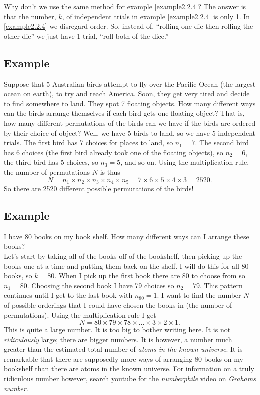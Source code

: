 \noindent Why don't we use the same method for example \ref{example2.2.4}? The answer is that the number, $k$, of independent trials in example \ref{example2.2.4} is only 1. In \ref{example2.2.4} we disregard order. So, instead of, ``rolling one die then rolling the other die'' we just have 1 trial, ``roll both of the dice.''

\subsection{Example} \label{example1}
Suppose that 5 Australian birds attempt to fly over the Pacific Ocean (the largest ocean on earth), to try and reach America. Soon, they get very tired and decide to find somewhere to land. They spot 7 floating objects. How many different ways can the birds arrange themselves if each bird gets one floating object? That is, how many different permutations of the birds can we have if the birds are ordered by their choice of object? Well, we have 5 birds to land, so we have 5 independent trials. The first bird has 7 choices for places to land, so $n_1 = 7$. The second bird has 6 choices (the first bird already took one of the floating objects), so $n_2 = 6$, the third bird has 5 choices, so $n_3 = 5$, and so on. Using the multiplication rule, the number of permutations $N$ is thus
\[
N = n_1\times n_2 \times n_3 \times n_4 \times n_5 = 7\times 6 \times 5 \times 4 \times 3 = 2520.
\]
So there are 2520 different possible permutations of the birds!

\subsection{Example} \label{example2} \label{80books}
I have 80 books on my book shelf. How many different ways can I arrange these books? \\

\noindent Let's start by taking all of the books off of the bookshelf, then picking up the books one at a time and putting them back on the shelf. I will do this for all 80 books, so $k = 80$. When I pick up the first book there are 80 to choose from so $n_1 = 80$. Choosing the second book I have 79 choices so $n_2 = 79$. This pattern continues until I get to the last book with $n_{80} = 1$. I want to find the number $N$ of possible orderings that I could have chosen the books in (the number of permutations). Using the multiplication rule I get
\[
N = 80\times79\times78\times\ldots\times 3\times2 \times1. \label{example3}
\]
This is quite a large number. It is too big to bother writing here. It is not \textit{ridiculously} large; there are bigger numbers. It is however, a number much greater than the estimated total number of \textit{atoms in the known universe}. It is remarkable that there are supposedly more ways of arranging 80 books on my bookshelf than there are atoms in the known universe. For information on a truly ridiculous number however, search youtube for the \textit{numberphile} video on \textit{Grahams number}. 

